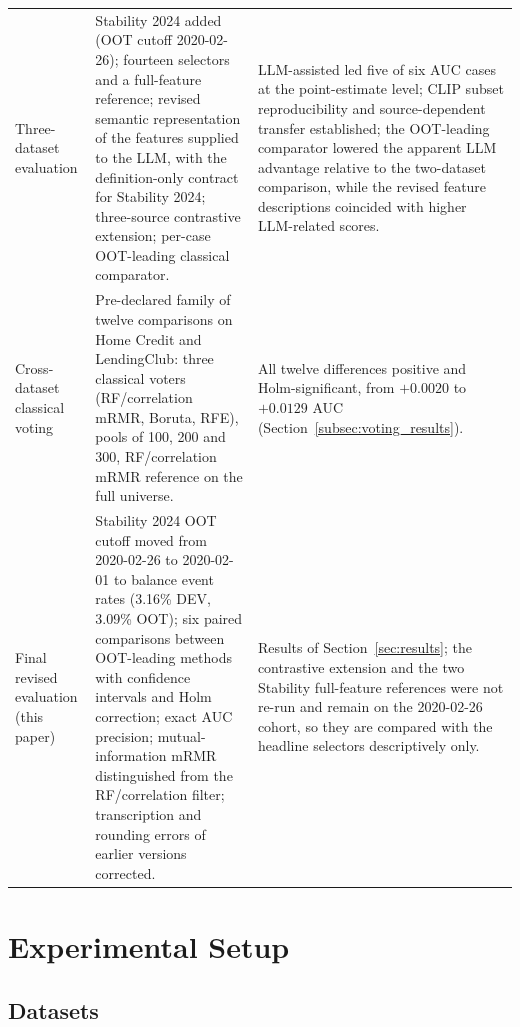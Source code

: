 \documentclass[final,5p,twocolumn]{elsarticle}
\begin{document}
\begin{table}[htbp]
\begin{threeparttable}
\begin{tabular}{@{}L{27mm}L{\dimexpr(\textwidth-27mm-4\tabcolsep)/2\relax}L{\dimexpr(\textwidth-27mm-4\tabcolsep)/2\relax}@{}}
\addlinespace
Three-dataset evaluation & Stability 2024 added (OOT cutoff 2020-02-26); fourteen selectors and a full-feature reference; revised semantic representation of the features supplied to the LLM, with the definition-only contract for Stability 2024; three-source contrastive extension; per-case OOT-leading classical comparator. & LLM-assisted led five of six AUC cases at the point-estimate level; CLIP subset reproducibility and source-dependent transfer established; the OOT-leading comparator lowered the apparent LLM advantage relative to the two-dataset comparison, while the revised feature descriptions coincided with higher LLM-related scores. \\
\addlinespace
Cross-dataset classical voting & Pre-declared family of twelve comparisons on Home Credit and LendingClub: three classical voters (RF/correlation mRMR, Boruta, RFE), pools of 100, 200 and 300, RF/correlation mRMR reference on the full universe. & All twelve differences positive and Holm-significant, from $+0.0020$ to $+0.0129$ AUC (Section~\ref{subsec:voting_results}). \\
\addlinespace
Final revised evaluation (this paper) & Stability 2024 OOT cutoff moved from 2020-02-26 to 2020-02-01 to balance event rates (3.16\% DEV, 3.09\% OOT); six paired comparisons between OOT-leading methods with confidence intervals and Holm correction; exact AUC precision; mutual-information mRMR distinguished from the RF/correlation filter; transcription and rounding errors of earlier versions corrected. & Results of Section~\ref{sec:results}; the contrastive extension and the two Stability full-feature references were not re-run and remain on the 2020-02-26 cohort, so they are compared with the headline selectors descriptively only. \\
\bottomrule
\end{tabular}
\end{threeparttable}
\end{table}


\section{Experimental Setup}
\label{sec:experimental_setup}

\subsection{Datasets}
\label{subsec:datasets}
\end{document}
